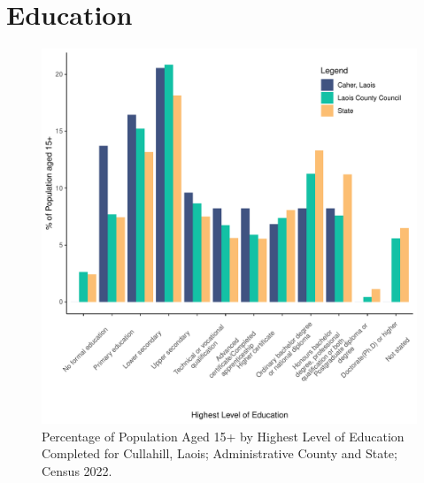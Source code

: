 \documentclass{article}
\begin{document}
\section{Education}\label{sect:Edu}
\begin{figure}[H]
	\centering
	\includegraphics[width = 120mm]{../figures/EduED.pdf}
	\caption{Percentage of Population Aged 15+ by Highest Level of Education Completed for Cullahill, Laois; Administrative County and State; Census 2022.}
	\label{fig:vbnv}
	\end{figure}
\end{document}
